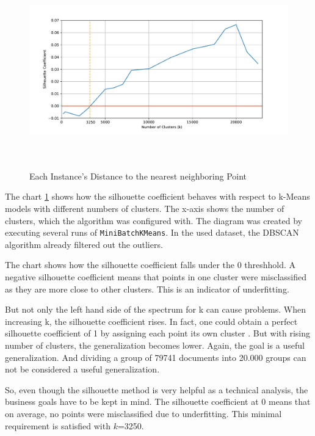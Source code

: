  \begin{figure}[!h]
	\centering
	\includegraphics[height=8.5cm]{Bilder/models/elbow.pdf}
	\caption{Each Instance's Distance to the nearest neighboring Point}
	\label{fig:silhouette}
\end{figure}

The chart \ref{fig:silhouette} shows how the silhouette coefficient behaves with respect to k-Means models with different numbers of clusters. The x-axis shows the number of clusters, which the algorithm was configured with. The diagram was created by executing several runs of \lstinline|MiniBatchKMeans|. In the used dataset, the DBSCAN algorithm already filtered out the outliers.

The chart shows how the silhouette coefficient falls under the 0 threshhold. A negative silhouette coefficient means that points in one cluster were misclassified as they are more close to other clusters. This is an indicator of underfitting. 

But not only the left hand side of the spectrum for k can cause problems. When increasing k, the silhouette coefficient rises. In fact, one could obtain a perfect silhouette coefficient of 1 by assigning each point its own cluster \cite{yildirimTwoChallengesKMeans2020}. But with rising number of clusters, the generalization becomes lower. Again, the goal is a useful generalization. And dividing a group of 79741 documents into 20.000 groups can not be considered a useful generalization.

So, even though the silhouette method is very helpful as a technical analysis, the business goals have to be kept in mind. The silhouette coefficient at 0 means that on average, no points were misclassified due to underfitting. This minimal requirement is satisfied with $k$=3250.

